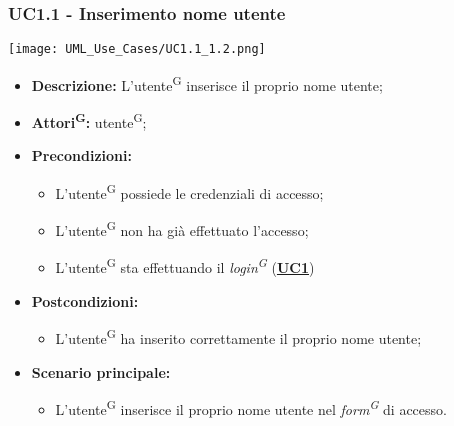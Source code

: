 \subsubsection{UC1.1 - Inserimento nome utente}
\label{sec:UC1.1}
\texttt{[image: UML\_Use\_Cases/UC1.1\_1.2.png]}
\begin{itemize}
	\item \textbf{Descrizione:} L’utente\textsuperscript{G} inserisce il proprio nome utente;
	\item \textbf{Attori\textsuperscript{G}:} utente\textsuperscript{G};
	\item \textbf{Precondizioni:} 
	\begin{itemize}
		\item L’utente\textsuperscript{G} possiede le credenziali di accesso;
		\item L’utente\textsuperscript{G} non ha già effettuato l’accesso;
		\item L’utente\textsuperscript{G} sta effettuando il \textit{login\textsuperscript{G}} (\hyperref[sec:UC1]{\textbf{UC1}})
	\end{itemize}
	\item \textbf{Postcondizioni:} 
	\begin{itemize}
		\item L’utente\textsuperscript{G} ha inserito correttamente il proprio nome utente;
	\end{itemize}
	\item \textbf{Scenario principale:} 
	\begin{itemize}
		\item L’utente\textsuperscript{G} inserisce il proprio nome utente nel \textit{form\textsuperscript{G}} di accesso.
	\end{itemize}
\end{itemize}

